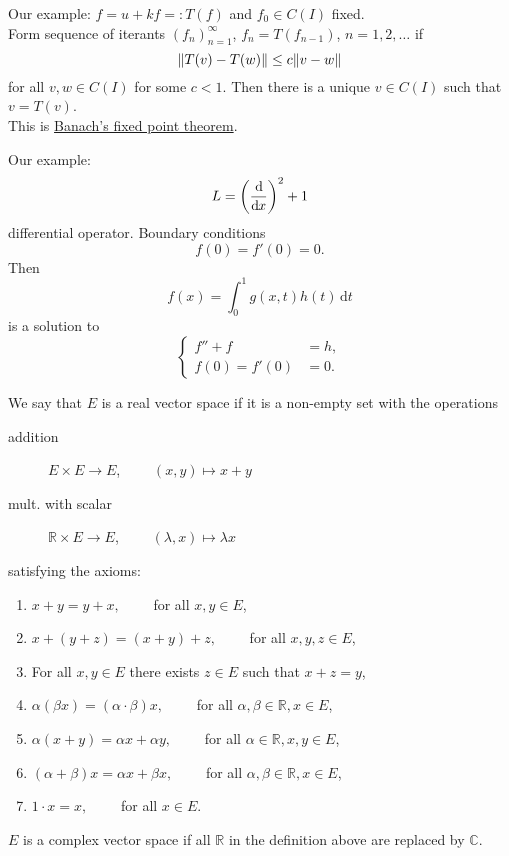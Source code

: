 Our example: $f=u+kf =: T(f)$ and $f_0 \in C(I)$ fixed. \\
Form sequence of iterants $(f_n)_{n=1}^{\infty}$, $f_n = T(f_{n-1})$, $n=1,2,\dots$ if
\[
	\norm{T(v)-T(w)} \leq c \norm{v-w}
\]
for all $v,w \in C(I)$ for some $c<1$. Then there is a unique $v \in C(I)$ such that $v = T(v)$. \\
This is \underline{Banach's fixed point theorem}.
\begin{definition*}
	Our example: 
	\[
		L = \left( \frac{\mathrm{d}\mkern-1.0mu }{\mathrm{d}\mkern-1.0mu x}  \right)^2 + 1 
	\]
	differential operator. Boundary conditions 
	\[
		f(0) = f'(0) = 0.
	\]
	Then 
	\[
		f(x) = \int_{0}^{1} g(x,t)h(t) \,\mathrm{d}t 
	\]
	is a solution to
	\[
		\begin{cases}
			f''+f &= h, \\
			f(0) = f'(0)& = 0.	
		\end{cases}
	\]
\end{definition*}
\begin{definition*}
	We say that $E$ is a real vector space  if it is a non-empty set with the operations 
	\begin{description}
		\item[addition] $E \times E \to E$, $\qquad (x,y) \mapsto x+y$
		\item[mult. with scalar] $\mathbb{R} \times E \to E$, $ \qquad (\lambda,x) \mapsto \lambda x$ 
	\end{description}
	satisfying the axioms:
	\begin{enumerate}[(1)]
		\item $x+y = y+x, \qquad$ for all $x,y \in E$,
		\item $x+(y+z)= (x+y)+z, \qquad $ for all $x,y,z \in E$,
		\item For all $x,y \in E$ there exists $z \in E$ such that $x+z = y$,
		\item $\alpha (\beta x) = (\alpha \cdot \beta)x, \qquad $ for all $\alpha,\beta \in \mathbb{R}, x \in E$,
		\item $\alpha(x+y) = \alpha x+ \alpha y, \qquad $ for all $\alpha \in \mathbb{R}, x,y \in E$,
		\item $(\alpha + \beta) x = \alpha x + \beta x, \qquad $ for all $\alpha, \beta \in \mathbb{R}, x \in E$,
		\item $1 \cdot x = x, \qquad $ for all $x \in E$.  
	\end{enumerate}
\end{definition*}
\begin{bemerkung}
	$E$ is a complex vector space if all $\mathbb{R}$ in the definition above are replaced by $\mathbb{C}$.
\end{bemerkung}
